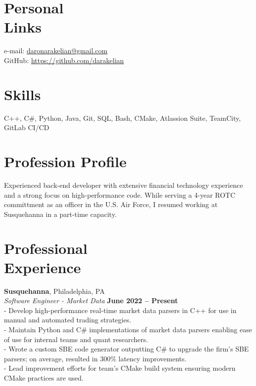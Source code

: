 \documentclass[margin,line]{resume}
\begin{document}
\begin{resume}

    \section{\mysidestyle Personal\\Links}
    \hfill e-mail: \href{mailto://daronarakelian@gmail.com}{daronarakelian@gmail.com} \vspace{0mm}\\\vspace{0mm}%
    \hfill GitHub: \url{https://github.com/darakelian} \vspace{0mm}\\\vspace{-4.5mm}%
    \section{\mysidestyle Skills} 
    C++, C\#, Python, Java, Git, SQL, Bash, CMake, Atlassion Suite, TeamCity, GitLab CI/CD

    \section{\mysidestyle Profession Profile}
    Experienced back-end developer with extensive financial technology experience and a strong focus on high-performance code. While serving a 4-year ROTC committment as an officer in the U.S. Air Force, I resumed working at Susquehanna in a part-time capacity.
  
    \section{\mysidestyle Professional\\Experience}
    \textbf{Susquehanna}, Philadelphia, PA \vspace{2mm}\\\vspace{1mm}%
    \textsl{Software Engineer - Market Data} \hfill \textbf{June 2022 -- Present}\\
    - Develop high-performance real-time market data parsers in C++ for use in manual and automated trading strategies.\vspace{1mm}\\%
    - Maintain Python and C\# implementations of market data parsers enabling ease of use for internal teams and quant researchers.\vspace{1mm}\\%
    - Wrote a custom SBE code generator outputting C\# to upgrade the firm's SBE parsers; on average, resulted in 300\% latency improvements.\vspace{1mm}\\%
    - Lead improvement efforts for team's CMake build system ensuring modern CMake practices are used.


\end{resume}
\end{document}
